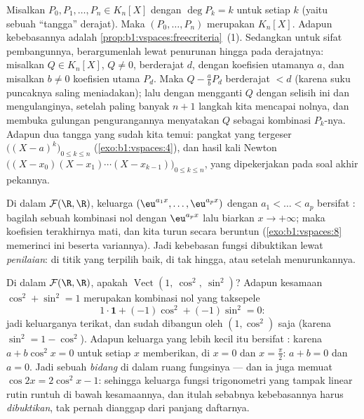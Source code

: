 \begin{example}
\label{ex:b1:vspaces:staircase}
Misalkan $P_0, P_1, \dots, P_n \in K_n[X]$ dengan $\deg P_k = k$ untuk setiap
$k$ (yaitu sebuah ``tangga'' derajat). Maka $(P_0, \dots, P_n)$ merupakan
 $K_n[X]$. Adapun kebebasannya adalah
\cref{prop:b1:vspaces:freecriteria}~(1). Sedangkan untuk sifat
pembangunnya, berargumenlah lewat penurunan hingga pada derajatnya: misalkan $Q \in
K_n[X]$, $Q \neq 0$, berderajat $d$, dengan koefisien utamanya $a$,
dan misalkan $b \neq 0$ koefisien utama $P_d$. Maka $Q -
\frac ab P_d$ berderajat $< d$ (karena suku puncaknya saling meniadakan); lalu dengan mengganti
$Q$ dengan selisih ini dan mengulanginya, setelah paling banyak $n + 1$ langkah
kita mencapai  nolnya, dan membuka gulungan pengurangannya
menyatakan $Q$ sebagai kombinasi $P_k$-nya. Adapun dua tangga
yang sudah kita temui: pangkat yang tergeser $\bigl((X-a)^k\bigr)_{0 \leq k
\leq n}$ (\cref{exo:b1:vspaces:4}), dan hasil kali Newton
$\bigl((X - x_0)(X - x_1)\cdots(X - x_{k-1})\bigr)_{0 \leq k \leq
n}$, yang dipekerjakan pada soal akhir pekannya.
\end{example}

\begin{example}\label{ex:b1:vspaces:functionfree}
Di dalam $\mathcal{F}(\R,\R)$, keluarga $(\eu^{a_1 x}, \dots, \eu^{a_p
x})$ dengan $a_1 < \dots < a_p$ bersifat : bagilah sebuah kombinasi nol dengan
$\eu^{a_p x}$ lalu biarkan $x \to +\infty$; maka koefisien terakhirnya mati,
dan kita turun secara beruntun (\cref{exo:b1:vspaces:8} memerinci ini beserta
variannya). Jadi kebebasan fungsi dibuktikan lewat \emph{penilaian}:
di titik yang terpilih baik, di tak hingga, atau setelah menurunkannya.
\end{example}

\begin{example}
\label{ex:b1:vspaces:hiddenrelation}
Di dalam $\mathcal{F}(\R, \R)$, apakah
$\operatorname{Vect}(1,\ \cos^2,\ \sin^2)$? Adapun kesamaan
$\cos^2 + \sin^2 = 1$ merupakan kombinasi nol yang taksepele
\[
1\cdot\mathbf{1} + (-1)\cos^2 + (-1)\sin^2 = 0 :
\]
jadi keluarganya terikat, dan  sudah dibangun oleh
$(1, \cos^2)$ saja (karena $\sin^2 = 1 - \cos^2$). Adapun keluarga yang lebih kecil itu
bersifat : karena $a + b\cos^2 x = 0$ untuk setiap $x$ memberikan, di $x = 0$ dan
$x = \frac\pi2$: $a + b = 0$ dan $a = 0$. Jadi  sebuah
\emph{bidang} di dalam ruang fungsinya --- dan ia juga memuat
$\cos 2x = 2\cos^2 x - 1$: sehingga keluarga fungsi trigonometri yang
tampak linear rutin runtuh di bawah kesamaannya,
dan itulah sebabnya kebebasannya harus \emph{dibuktikan}, tak pernah dianggap dari
panjang daftarnya.
\end{example}

